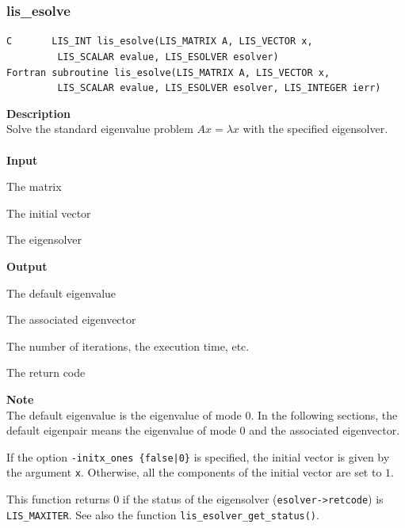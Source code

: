 \documentclass[a4paper]{article}
\newcommand{\namelistlabel}[1]{\mbox{#1}\hfill}
\newenvironment{namelist}[1]{%
\begin{list}{}
  {\let\makelabel\namelistlabel
  \settowidth{\labelwidth}{#1}
  \setlength{\leftmargin}{1.1\labelwidth}}
  }{%
\end{list}}
\begin{document}
\subsubsection{lis\_esolve}
\begin{screen}
\verb|C       LIS_INT lis_esolve(LIS_MATRIX A, LIS_VECTOR x,|\\ 
\verb|         LIS_SCALAR evalue, LIS_ESOLVER esolver)|\\
\verb|Fortran subroutine lis_esolve(LIS_MATRIX A, LIS_VECTOR x,|\\
\verb|         LIS_SCALAR evalue, LIS_ESOLVER esolver, LIS_INTEGER ierr)|
\end{screen}
{\bf Description}\\
\indent
Solve the standard eigenvalue problem $Ax = \lambda x$ with the specified eigensolver.
\\ \\
\noindent
{\bf Input}
\begin{namelist}{XXXXXXXXXXXXXXXXXXXX}
\item[\tt A] The matrix
\item[\tt x] The initial vector
\item[\tt esolver] The eigensolver
\end{namelist}
{\bf Output}
\begin{namelist}{XXXXXXXXXXXXXXXXXXXX}
\item[\tt evalue] The default eigenvalue
\item[\tt x] The associated eigenvector
\item[\tt esolver] The number of iterations, the execution time, etc.
\item[\tt ierr] The return code
\end{namelist}
{\bf Note}\\
\indent
The default eigenvalue is the eigenvalue of mode 0. In the following sections, the default eigenpair means the eigenvalue of mode 0 and the associated eigenvector.

If the option {\tt -initx\_ones \{false|0\}} is specified, the initial
vector is given by the argument {\tt x}.
Otherwise, all the components of the initial vector are set to $1$. 

This function returns 0 if the status of the eigensolver ({\tt esolver->retcode})
is {\tt LIS\_MAXITER}. See also the function
{\tt lis\_esolver\_get\_status()}. 

\newpage
\end{document}
